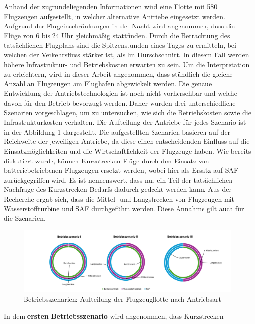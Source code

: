Anhand der zugrundeliegenden Informationen wird eine Flotte mit 580 Flugzeugen aufgestellt, 
in welcher alternative Antriebe eingesetzt werden.
Aufgrund der Flugeinschränkungen in der Nacht wird angenommen, 
dass die Flüge von 6 bis 24 Uhr gleichmäßig stattfinden. 
%
Durch die Betrachtung des tatsächlichen Flugplans sind die Spitzenstunden eines Tages zu ermitteln, 
bei welchen der Verkehrsfluss stärker ist, als im Durschschnitt.
In diesem Fall werden höhere Infrastruktur- und Betriebskosten erwarten zu sein.
Um die Interpretation zu erleichtern, wird in dieser Arbeit angenommen, 
dass stündlich die gleiche Anzahl an Flugzeugen am Flughafen abgewickelt werden. 
%
Die genaue Entwicklung der Antriebstechnologien ist noch nicht vorhersehbar und
welche davon für den Betrieb bevorzugt werden. Daher wurden drei unterschiedliche Szenarien vorgeschlagen, 
um zu untersuchen, wie sich die Betriebskosten sowie die Infrastrukturkosten verhalten.
Die Aufteilung der Antriebe für jedes Szenario ist in der Abbildung \ref{betriebsszenarien} dargestellt.
Die aufgestellten Szenarien basieren auf der Reichweite der jeweiligen Antriebe, 
da diese einen entscheidenden Einfluss auf die Einsatzmöglichkeiten und 
die Wirtschaftlichkeit der Flugzeuge haben. 
Wie bereits diskutiert wurde, können Kurzstrecken-Flüge durch 
den Einsatz von batteriebetriebenen Flugzeugen ersetzt werden, 
wobei hier als Ersatz auf SAF zurückgegriffen wird. 
Es ist nennenswert, dass nur ein Teil der tatsächlichen Nachfrage des Kurzstrecken-Bedarfs 
dadurch gedeckt werden kann. 
Aus der Recherche ergab sich, dass die Mittel- und Langstrecken von Flugzeugen mit 
Wasserstoffturbine und SAF durchgeführt werden.
Diese Annahme gilt auch für die Szenarien. \\
%
\begin{figure}[h]
	\centering
	\includegraphics[width=1.0\linewidth]{Bilder/Betriebsszenarien.png}
	\caption[Betriebsszenarien mit Aufteilung der Flugzeugflotte nach Antriebsart]{Betriebsszenarien: Aufteilung der Flugzeugflotte nach Antriebsart}
	\label{betriebsszenarien}
\end{figure}
%
In dem \textbf{ersten Betriebsszenario} wird angenommen, dass Kurzstrecken
